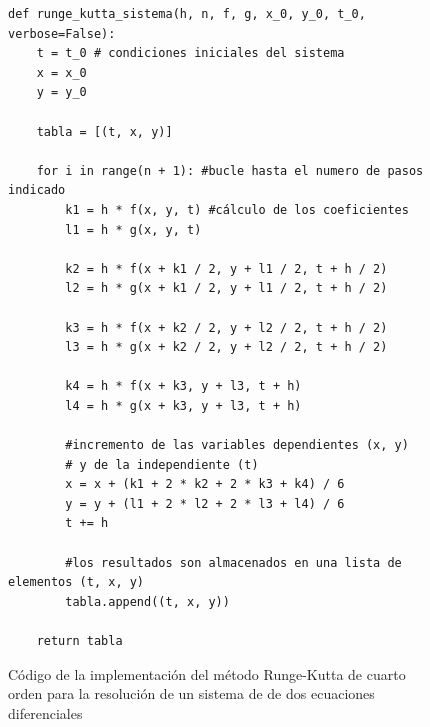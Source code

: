 \documentclass[11pt]{article}
\begin{document}
\begin{figure}
\begin{lstlisting}
def runge_kutta_sistema(h, n, f, g, x_0, y_0, t_0, verbose=False):
	t = t_0 # condiciones iniciales del sistema
	x = x_0
	y = y_0

	tabla = [(t, x, y)]

	for i in range(n + 1): #bucle hasta el numero de pasos indicado
		k1 = h * f(x, y, t) #cálculo de los coeficientes
		l1 = h * g(x, y, t)

		k2 = h * f(x + k1 / 2, y + l1 / 2, t + h / 2)
		l2 = h * g(x + k1 / 2, y + l1 / 2, t + h / 2)

		k3 = h * f(x + k2 / 2, y + l2 / 2, t + h / 2)
		l3 = h * g(x + k2 / 2, y + l2 / 2, t + h / 2)

		k4 = h * f(x + k3, y + l3, t + h)
		l4 = h * g(x + k3, y + l3, t + h)

		#incremento de las variables dependientes (x, y)
		# y de la independiente (t)
		x = x + (k1 + 2 * k2 + 2 * k3 + k4) / 6
		y = y + (l1 + 2 * l2 + 2 * l3 + l4) / 6
		t += h

		#los resultados son almacenados en una lista de elementos (t, x, y)
		tabla.append((t, x, y))

	return tabla
\end{lstlisting}
\caption{Código de la implementación del método Runge-Kutta de cuarto orden para la resolución de un sistema de de dos ecuaciones diferenciales}
\label{runge_kutta_code}
\end{figure}
\end{document}
